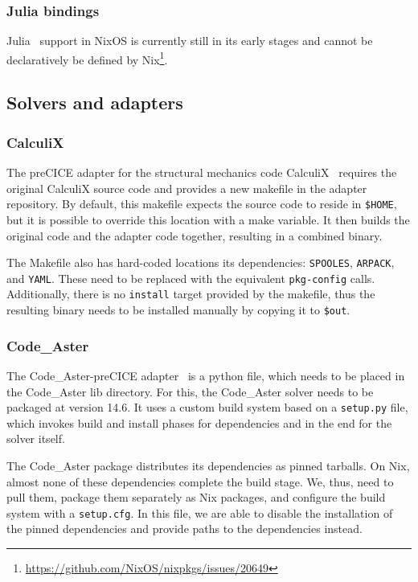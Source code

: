 \documentclass{eceasst}
\begin{document}
\subsubsection{Julia bindings}

Julia~\cite{bezanson2017julia} support in NixOS is currently still in its early stages and cannot be declaratively be defined by Nix\footnote{\url{https://github.com/NixOS/nixpkgs/issues/20649}}.

\subsection{Solvers and adapters}

\subsubsection{CalculiX}

The preCICE adapter for the structural mechanics code CalculiX~\cite{Uekermann2017_Adapters} requires the original CalculiX source code and provides a new makefile in the adapter repository.
By default, this makefile expects the source code to reside in \texttt{\$HOME}, but it is possible to override this location with a make variable.
It then builds the original code and the adapter code together, resulting in a combined binary.

The Makefile also has hard-coded locations its dependencies: \texttt{SPOOLES}, \texttt{ARPACK}, and \texttt{YAML}. These need to be replaced with the equivalent \texttt{pkg-config} calls.
Additionally, there is no \texttt{install} target provided by the makefile, thus the resulting binary needs to be installed manually by copying it to \texttt{\$out}.

\subsubsection{Code\_Aster}

The Code\_Aster-preCICE adapter~\cite{Uekermann2017_Adapters} is a python file, which needs to be placed in the Code\_Aster lib directory.
For this, the Code\_Aster solver needs to be packaged at version 14.6.
It uses a custom build system based on a \texttt{setup.py} file, which invokes build and install phases for dependencies and in the end for the solver itself.

The Code\_Aster package distributes its dependencies as pinned tarballs.
On Nix, almost none of these dependencies complete the build stage. We, thus, need to pull them, package them separately as Nix packages, and configure the build system with a \texttt{setup.cfg}.
In this file, we are able to disable the installation of the pinned dependencies and provide paths to the dependencies instead.
\end{document}

